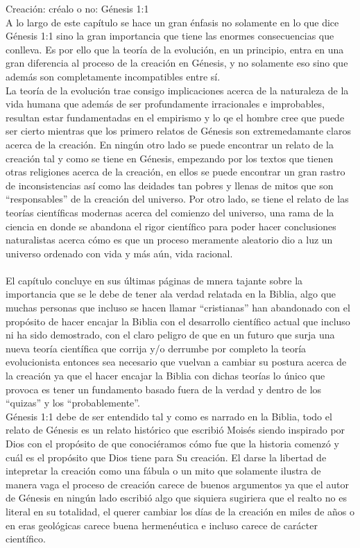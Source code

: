 \begin{section}{Creación: créalo o no: Génesis 1:1}
\\
A lo largo de este capítulo se hace un gran énfasis no solamente en lo que dice Génesis 1:1 sino la gran importancia que tiene  las enormes consecuencias que conlleva. Es por ello que la teoría de la evolución, en un principio, entra en una gran diferencia al proceso de la creación en Génesis, y no solamente eso sino que además son completamente incompatibles entre sí.\\
La teoría de la evolución trae consigo implicaciones acerca de la naturaleza de la vida humana que además de ser profundamente irracionales e improbables, resultan estar fundamentadas en el empirismo y lo qe el hombre cree que puede ser cierto mientras que los primero relatos de Génesis son extremedamante claros acerca de la creación.
\newpage
En ningún otro lado se puede encontrar un relato de la creación tal y como se tiene en Génesis, empezando por los textos que tienen otras religiones acerca de la creación, en ellos se puede encontrar un gran rastro de inconsistencias así como las deidades tan pobres y llenas de mitos que son ``responsables'' de la creación del universo. Por otro lado, se tiene el relato de las teorías científicas modernas acerca del comienzo del universo, una rama de la ciencia en donde se abandona el rigor científico para poder hacer conclusiones naturalistas acerca cómo es que un proceso meramente aleatorio dio a luz un universo ordenado con vida y más aún, vida racional.\\
\\
El capítulo concluye en sus últimas páginas de mnera tajante sobre la importancia que se le debe de tener ala verdad relatada en la Biblia, algo que muchas personas que incluso se hacen llamar ``cristianas'' han abandonado con el propósito de hacer encajar la Biblia con el desarrollo científico actual que incluso ni ha sido demostrado, con el claro peligro de que en un futuro que surja una nueva teoría científica que corrija y/o derrumbe por completo la teoría evolucionista entonces sea necesario que vuelvan a cambiar su postura acerca de la creación ya que el hacer encajar la Biblia con dichas teorías lo único que provoca es tener un fundamento basado fuera de la verdad y dentro de los ``quizas'' y los ``probablemente''. \\
Génesis 1:1 debe de ser entendido tal y como es narrado en la Biblia, todo el relato de Génesis es un relato histórico que escribió Moisés siendo inspirado por Dios con el propósito de que conociéramos cómo fue que la historia comenzó y cuál es el propósito que Dios tiene para Su creación. El darse la libertad de intepretar la creación como una fábula o un mito que solamente ilustra de manera vaga el proceso de creación carece de buenos argumentos ya que el autor de Génesis en ningún lado escribió algo que siquiera sugiriera que el realto no es literal en su totalidad, el querer cambiar los días de la creación en miles de años o en eras geológicas carece buena hermenéutica e incluso carece de carácter científico.\\

\end{section}
